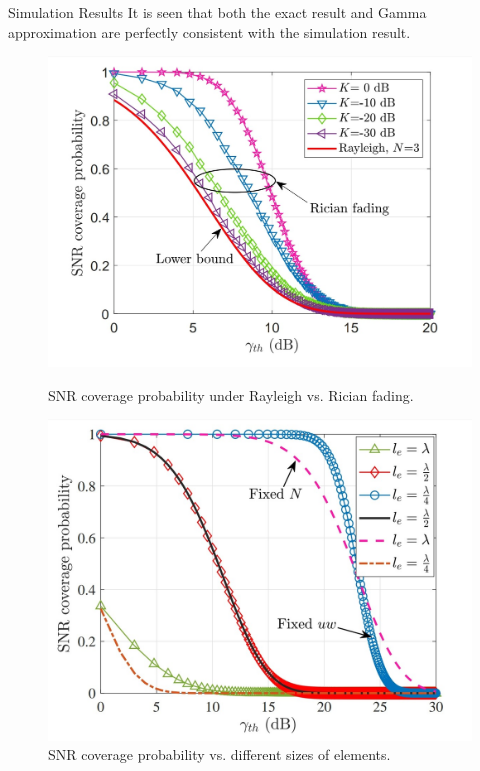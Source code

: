 \documentclass{beamer}
\begin{document}
\begin{frame}{Simulation Results}
    \small{It is seen that both the exact result and Gamma approximation are perfectly consistent with the simulation result.}
    \begin{figure}
        \centering
        \includegraphics[scale = 0.108]{figures/rayleigh_vs_rician.jpg}
        \caption{SNR coverage probability under Rayleigh vs. Rician fading.}
        \label{fig:rayleigh_vs_rician}
        \includegraphics[scale = 0.11]{figures/SNR_vs_elementSize.jpg}
        \caption{SNR coverage probability vs. different sizes of elements.}
    \end{figure}
\end{frame}
\end{document}
